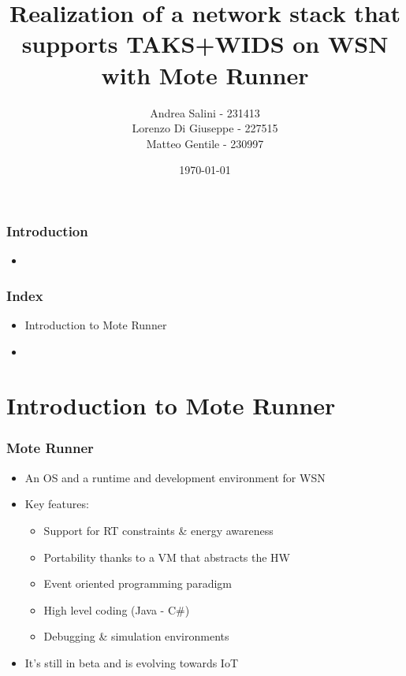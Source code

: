 \documentclass[12pt, compress]{beamer}
\title{Realization of a network stack that supports TAKS+WIDS on WSN with Mote Runner}
\subtitle{}
\date{\today}
\author{Andrea Salini - 231413\\Lorenzo Di Giuseppe - 227515\\Matteo Gentile - 230997}
\institute{DISIM - Università degli Studi dell’Aquila}
\begin{document}
  \maketitle
  
\begin{frame}[fragile]
  \frametitle{Introduction}
  \begin{itemize}
    \item 
  \end{itemize}
\end{frame}

\begin{frame}[fragile]
  \frametitle{Index}
  \begin{itemize}
    \item Introduction to Mote Runner
    \item 
  \end{itemize}
\end{frame}

\section{Introduction to Mote Runner}
\begin{frame}[fragile]
  \frametitle{Mote Runner}
  \begin{itemize}
    \item An OS and a runtime and development environment for WSN
    \item Key features:
    \begin{itemize}
      \item Support for RT constraints \& energy awareness
      \item Portability thanks to a VM that abstracts the HW
      \item Event oriented programming paradigm
      \item High level coding (Java - C\#)
      \item Debugging \& simulation environments
    \end{itemize}
    \item It’s still in beta and is evolving towards IoT
  \end{itemize}
\end{frame}
\end{document}
